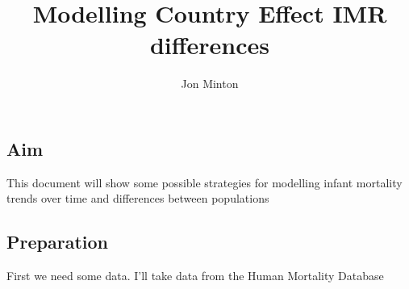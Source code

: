 \documentclass[
  letterpaper,
  DIV=11,
  numbers=noendperiod]{scrartcl}
\title{Modelling Country Effect IMR differences}
\author{Jon Minton}
\date{}
\begin{document}
\maketitle
\ifdefined\Shaded\renewenvironment{Shaded}{\begin{tcolorbox}[sharp corners, boxrule=0pt, enhanced, interior hidden, borderline west={3pt}{0pt}{shadecolor}, breakable, frame hidden]}{\end{tcolorbox}}\fi

\hypertarget{aim}{%
\subsection{Aim}\label{aim}}

This document will show some possible strategies for modelling infant
mortality trends over time and differences between populations

\hypertarget{preparation}{%
\subsection{Preparation}\label{preparation}}

First we need some data. I'll take data from the Human Mortality
Database
\end{document}

